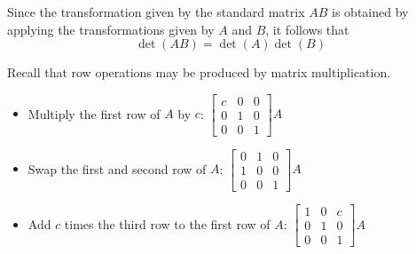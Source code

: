 \begin{applicationActivities}
\begin{activity}{5}
\end{activity}

\begin{fact}
Since the transformation given by the standard matrix \(AB\) is obtained
by applying the transformations given by \(A\) and \(B\), it follows that 
\[\det(AB)=\det(A)\det(B)\]
\end{fact}

\begin{remark}
Recall that row operations may be produced by matrix multiplication.
\begin{itemize}
\item Multiply the first row of \(A\) by \(c\): \(
  \begin{bmatrix}
  c & 0 & 0 \\
  0 & 1 & 0 \\
  0 & 0 & 1
  \end{bmatrix}A
\)
\item Swap the first and second row of \(A\): \(
  \begin{bmatrix}
  0 & 1 & 0 \\
  1 & 0 & 0 \\
  0 & 0 & 1
  \end{bmatrix}A
\)
\item Add \(c\) times the third row to the first row of \(A\): \(
  \begin{bmatrix}
  1 & 0 & c \\
  0 & 1 & 0 \\
  0 & 0 & 1
  \end{bmatrix}A
\)
\end{itemize}
\end{remark}



\end{applicationActivities}
